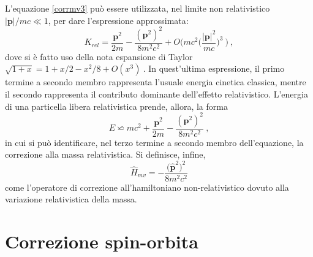 \documentclass[12pt,a4paper]{report}
\numberwithin{equation}{section}
\numberwithin{section}{chapter}
\begin{document}
	L'equazione \eqref{corrmv3} pu\`o essere utilizzata, nel limite non relativistico $|\boldsymbol{p}|/mc \ll 1$, per dare l'espressione approssimata:
	\begin{equation}
	\label{corrmv4}
	K_{rel} = \frac{\boldsymbol{p}^2}{2m} - \frac{(\boldsymbol{p}^2)^2}{8m^2c^2} + O\bigg(mc^2\bigg(\frac{|\boldsymbol{p}|^2}{mc}\bigg)^3~\bigg) ~,
	\end{equation}
	dove si \`e fatto uso della nota espansione di Taylor $\sqrt{1 + x} = 1 + x/2 - x^2/8 + O(x^3)~$. In quest'ultima espressione, il primo termine a secondo membro rappresenta l'usuale energia cinetica classica, mentre il secondo rappresenta il contributo dominante dell'effetto relativistico. L'energia di una particella libera relativistica prende, allora, la forma
	\begin{equation}
	\label{corrmv5}
	E \backsimeq mc^2 +\frac{\boldsymbol{p}^2}{2m} - \frac{(\boldsymbol{p}^2)^2}{8m^2c^2}~,
	\end{equation}
	in cui si pu\`o identificare, nel terzo termine a secondo membro dell'equazione, la correzione alla massa relativistica. Si definisce, infine,
	\begin{equation}
	\label{corrmv6}
	\widehat{H}_{mv} = -\frac{\big(\boldsymbol{\widehat{p}}^2\big)^2}{8m^2c^2}
	\end{equation}
	come l'operatore di correzione all'hamiltoniano non-relativistico dovuto alla variazione relativistica della massa. 
	
	\section{Correzione spin-orbita} \label{sec:corrso}
	
\end{document}
